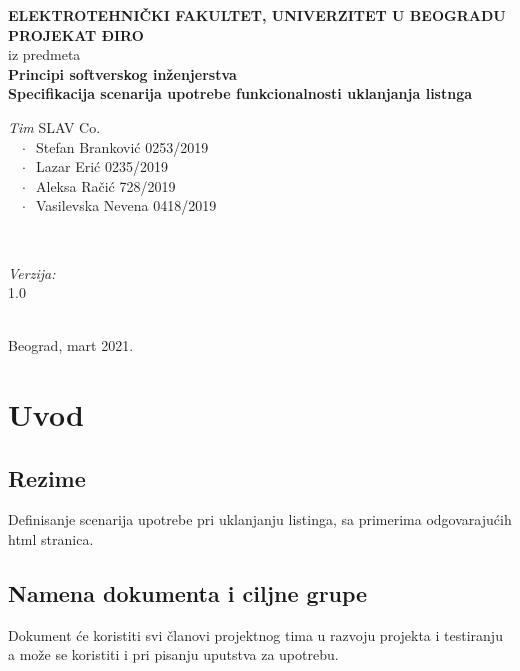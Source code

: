 \documentclass[12pt]{article}
\begin{document}
    \renewcommand{\labelenumii}{\arabic{enumi}.\arabic{enumii}}
	\begin{titlepage}  
		\center
		\textbf{ \LARGE ELEKTROTEHNIČKI FAKULTET, UNIVERZITET U BEOGRADU } \\[4cm]
		\textbf{ \Large PROJEKAT ĐIRO\texttrademark} \\[0.3cm]
		iz predmeta \\[0.3cm]
		\textbf{ \Large Principi softverskog inženjerstva} \\[0.7cm]
		{ \huge \bfseries Specifikacija scenarija upotrebe funkcionalnosti uklanjanja listnga } \\[6cm]
		

		\begin{minipage}{0.5\textwidth}
			\begin{flushleft}
				\large
				\emph{Tim} SLAV Co. \\
			     $\;\;\; \cdot \;\;$Stefan Branković  0253/2019\\
			     $\;\;\; \cdot \;\;$Lazar Erić 0235/2019\\
			     $\;\;\; \cdot \;\;$Aleksa Račić 728/2019\\
			     $\;\;\; \cdot \;\;$Vasilevska Nevena 0418/2019
			\end{flushleft}
		\end{minipage}
		~
		\begin{minipage}{0.4\textwidth}
			\begin{flushright}
				\large
				\emph{Verzija:} \\
				1.0
			\end{flushright}
		\end{minipage} \\[2cm]
		\enlargethispage{4\baselineskip}
		{ \large Beograd, mart 2021. }
		\vfill
	\end{titlepage}
\pagebreak
\tableofcontents
\pagebreak



\section{Uvod}
\subsection{Rezime}
Definisanje scenarija upotrebe pri uklanjanju listinga, sa primerima odgovarajućih html stranica.
\subsection{Namena dokumenta i ciljne grupe}
Dokument će koristiti svi članovi projektnog tima u razvoju projekta i testiranju a može se koristiti i pri pisanju uputstva za
upotrebu.
\end{document}
